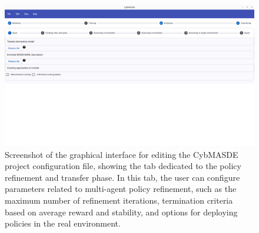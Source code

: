 \begin{figure}[h!]
       \centering
       \includegraphics[trim=0cm 15cm 0cm 0cm, clip,width=\linewidth]{figures/refining.png}
       \caption[Screenshot of the refinement and transfer tab of the CybMASDE graphical interface]{Screenshot of the graphical interface for editing the CybMASDE project configuration file, showing the tab dedicated to the policy refinement and transfer phase. In this tab, the user can configure parameters related to multi-agent policy refinement, such as the maximum number of refinement iterations, termination criteria based on average reward and stability, and options for deploying policies in the real environment.}

       \label{fig:cybmasde_refining_screenshot}
\end{figure}
\clearpage
